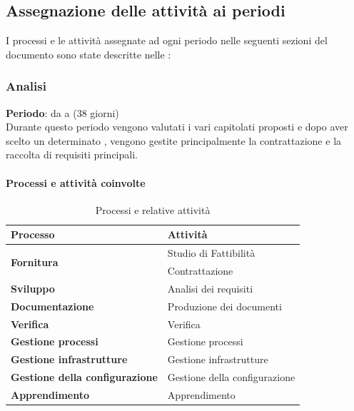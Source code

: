 \clearpage
\subsection{Assegnazione delle attività ai periodi}
	I processi e le attività assegnate ad ogni periodo nelle seguenti sezioni del documento sono state descritte nelle \ndpv:

	\subsubsection {Analisi}
		\textbf{Periodo}: da  a  (38 giorni) \\
		Durante questo periodo vengono valutati i vari capitolati proposti e dopo aver scelto un determinato , vengono gestite principalmente la contrattazione e la raccolta di requisiti principali.
		\paragraph{Processi e attività coinvolte}
			\begin{table}[H]
				\centering
				\begin{tabular}{ll}
					\toprule
					\textbf{Processo}                           & \textbf{Attività}              \\
					\midrule
					\multirow{2}{*}{\textbf{Fornitura}}         & Studio di Fattibilità          \\
					& Contrattazione                 \\
					\midrule
					\textbf{Sviluppo}          & Analisi dei requisiti          \\
					\midrule
					\textbf{Documentazione}            & Produzione dei documenti       \\
					\midrule
					\textbf{Verifica}                  & Verifica                       \\
					\midrule
					\textbf{Gestione processi} 					& Gestione processi              \\
					\midrule
					\textbf{Gestione infrastrutture}				& Gestione infrastrutture        \\
					\midrule
					\textbf{Gestione della configurazione}				& Gestione della configurazione        \\
					\midrule
					\textbf{Apprendimento} 						& Apprendimento                 \\
					\bottomrule
				\end{tabular}
				\caption{Processi e relative attività}
				\label{An-ProcessiAttività}
			\end{table}
